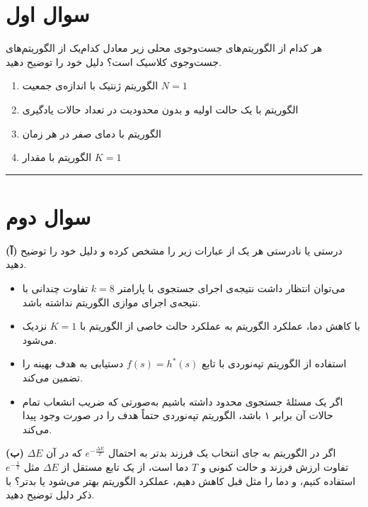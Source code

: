 \documentclass[a4paper,10pt]{article}
\begin{document}


\section{سوال اول}
هر کدام از الگوریتم‌های جست‌وجوی محلی زیر معادل کدام‌یک از الگوریتم‌های جست‌وجوی کلاسیک است؟ دلیل خود را توضیح دهید.

\begin{enumerate}
  \item[(آ)] الگوریتم ژنتیک با اندازه‌ی جمعیت $N = 1$
  \item[(ب)] الگوریتم  با یک حالت اولیه و بدون محدودیت در تعداد حالات یادگیری
  \item[(ج)] الگوریتم  با دمای صفر در هر زمان
  \item[(د)] الگوریتم  با مقدار $K = 1$
\end{enumerate}

\bigskip
\bigskip
\rule{\linewidth}{0.4pt}

\section{سوال دوم}

\noindent\textbf{(آ)} درستی یا نادرستی هر یک از عبارات زیر را مشخص کرده و دلیل خود را توضیح دهید.

\begin{itemize}
  \item می‌توان انتظار داشت نتیجه‌ی اجرای جستجوی  با پارامتر $k = 8$ تفاوت چندانی با نتیجه‌ی اجرای موازی الگوریتم  نداشته باشد.
  
  \item با کاهش دما، عملکرد الگوریتم  به عملکرد حالت خاصی از الگوریتم  با $K=1$ نزدیک می‌شود.
  
  \item استفاده از الگوریتم تپه‌نوردی با تابع $f(s) = h^{*}(s)$ دستیابی به هدف بهینه را تضمین می‌کند.
  
  \item اگر یک مسئلهٔ جستجوی محدود داشته باشیم به‌صورتی که ضریب انشعاب تمام حالات آن برابر ۱ باشد،
  الگوریتم تپه‌نوردی حتماً هدف را در صورت وجود پیدا می‌کند.
\end{itemize}

\bigskip

\noindent\textbf{(ب)} اگر در الگوریتم  به جای انتخاب یک فرزند بدتر به احتمال 
$e^{-\frac{\Delta E}{T}}$
که در آن $\Delta E$ تفاوت ارزش فرزند و حالت کنونی و $T$ دما است،
از یک تابع مستقل از $\Delta E$ مثل $e^{-\frac{1}{T}}$ استفاده کنیم،
و دما را مثل قبل کاهش دهیم، عملکرد الگوریتم بهتر می‌شود یا بدتر؟ با ذکر دلیل توضیح دهید.
\bigskip
\end{document}
